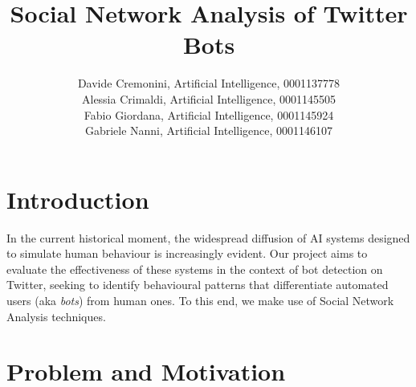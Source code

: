 \documentclass[12pt, a4paper]{article}
\author{Davide Cremonini, Artificial Intelligence, 0001137778
\\Alessia Crimaldi, Artificial Intelligence, 0001145505
\\Fabio Giordana, Artificial Intelligence, 0001145924
\\Gabriele Nanni, Artificial Intelligence, 0001146107}
\date{}
\title{Social Network Analysis of Twitter Bots}
\begin{document}
\maketitle










\section{Introduction}
	\label{introduction}
	
	In the current historical moment, the widespread diffusion of AI systems designed to simulate human behaviour is increasingly evident. Our project aims to evaluate the effectiveness of these systems in the context of bot detection on Twitter, seeking to identify behavioural patterns that differentiate automated users (aka \textit{bots}) from human ones. To this end, we make use of Social Network Analysis techniques.


\section{Problem and Motivation}
	\label{problem-and-motivation}
\end{document}
